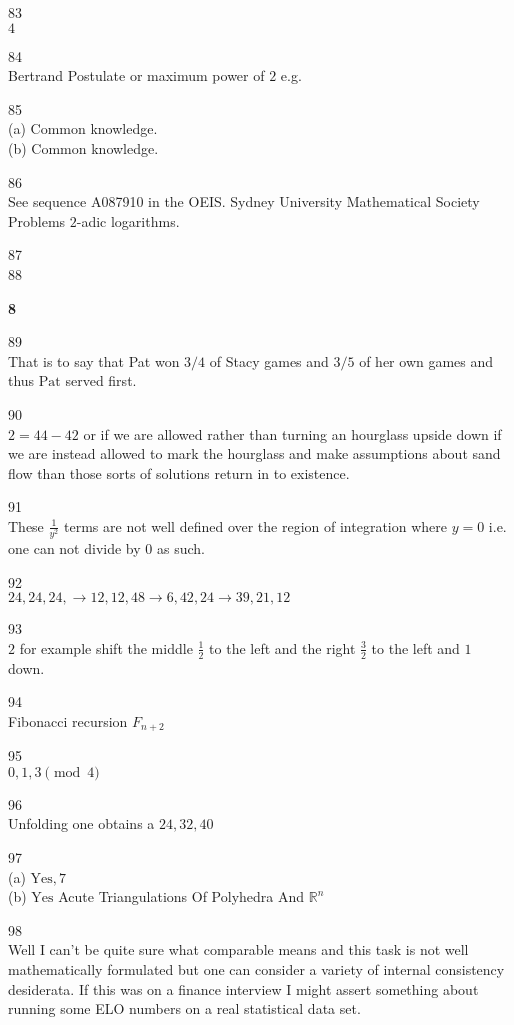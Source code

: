 83 \\
$\boxed{4}$

84 \\
Bertrand Postulate or maximum power of $2$ e.g.

85 \\
(a) Common knowledge. \\
(b) Common knowledge.

86 \\
See sequence A087910 in the OEIS. Sydney University Mathematical Society Problems $2$-adic logarithms.

87 \\


88 \\


\newpage

\textbf{8}

89 \\
That is to say that Pat won $3/4$ of Stacy games and $3/5$ of her own games and thus $\boxed{\text{Pat}}$ served first.

90 \\
$2=44-42$ or if we are allowed rather than turning an hourglass upside down if we are instead allowed to mark the hourglass and make assumptions about sand flow than those sorts of solutions return in to existence.

91 \\
These $\frac{1}{y^2}$ terms are not well defined over the region of integration where $y=0$ i.e. one can not divide by $0$ as such.

92 \\
$24,24,24, \to 12,12,48 \to 6,42,24 \to \boxed{39,21,12}$

93 \\
$\boxed{2}$ for example shift the middle $\frac{1}{2}$ to the left and the right $\frac{3}{2}$ to the left and $1$ down.

94 \\
Fibonacci recursion $\boxed{F_{n+2}}$

95 \\
$0,1,3 \pmod{4}$

96 \\
Unfolding one obtains a $24,32,\boxed{40}$

97 \\
(a) $\boxed{\text{Yes},7}$ \\
(b) $\boxed{\text{Yes}}$ Acute Triangulations Of Polyhedra And $\mathbb{R}^n$

98 \\
Well I can't be quite sure what comparable means and this task is not well mathematically formulated but one can consider a variety of internal consistency desiderata. If this was on a finance interview I might assert something about running some ELO numbers on a real statistical data set.

